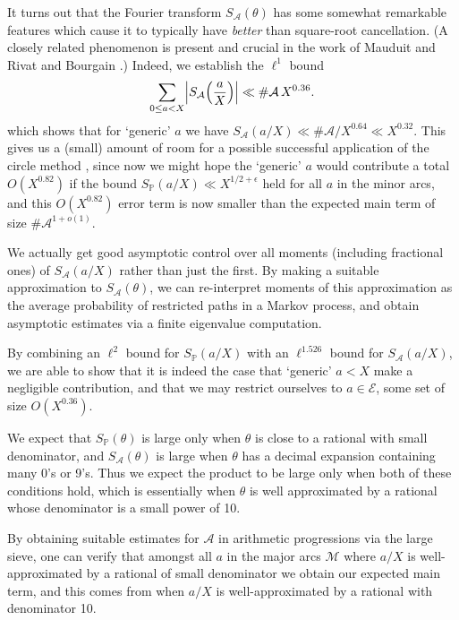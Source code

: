 \documentclass[10pt]{amsart}
\theoremstyle{plain}
\numberwithin{sblmm}{thrm}
\numberwithin{equation}{section}
\begin{document}
It turns out that the Fourier transform $S_{\mathcal{A}}(\theta)$ has some somewhat remarkable features which cause it to typically have \textit{better} than square-root cancellation. (A closely related phenomenon is present and crucial in the work of Mauduit and Rivat \cite{MauduitRivat} and Bourgain \cite{Bourgain}.) Indeed, we establish the $\ell^1$ bound
%
\begin{equation}
\sum_{0\le a<X}\Bigl|S_{\mathcal{A}}\Bigl(\frac{a}{X}\Bigr)\Bigr|\ll \#\mathcal{A}\,X^{0.36}.\label{eq:L1Bound}
\end{equation}
%
which shows that for `generic' $a$ we have $S_{\mathcal{A}}(a/X)\ll \#\mathcal{A}/X^{0.64}\ll X^{0.32}$. This gives us a (small) amount of room for a possible successful application of the circle method , since now we might hope the `generic' $a$ would contribute a total $O(X^{0.82})$ if the bound $S_{\mathbb{P}}(a/X)\ll X^{1/2+\epsilon}$ held for all $a$ in the minor arcs, and this $O(X^{0.82})$ error term  is now smaller than the expected main term of size $\#\mathcal{A}^{1+o(1)}$. 

We actually get good asymptotic control over all moments (including fractional ones) of $S_{\mathcal{A}}(a/X)$ rather than just the first. By making a suitable approximation to $S_{\mathcal{A}}(\theta)$, we can re-interpret moments of this approximation as the average probability of restricted paths in  a Markov process, and obtain asymptotic estimates via a finite eigenvalue computation.

By combining an $\ell^2$ bound for $S_{\mathbb{P}}(a/X)$ with an $\ell^{1.526}$ bound for $S_{\mathcal{A}}(a/X)$, we are able to show that it is indeed the case that `generic' $a<X$ make a negligible contribution, and that we may restrict ourselves to $a\in\mathcal{E}$, some set of size $O(X^{0.36})$.

We expect that $S_{\mathbb{P}}(\theta)$ is large only when $\theta$ is close to a rational with small denominator, and $S_{\mathcal{A}}(\theta)$ is large when $\theta$ has a decimal expansion containing many 0's or 9's. Thus we expect the product to be large only when both of these conditions hold, which is essentially when $\theta$ is well approximated by a rational whose denominator is a small power of 10.

By obtaining suitable estimates for $\mathcal{A}$ in arithmetic progressions via the large sieve, one can verify that amongst all $a$ in the major arcs $\mathcal{M}$ where $a/X$ is well-approximated by a rational of small denominator we obtain our expected main term, and this comes from when $a/X$ is well-approximated by a rational with denominator 10.
\end{document}
